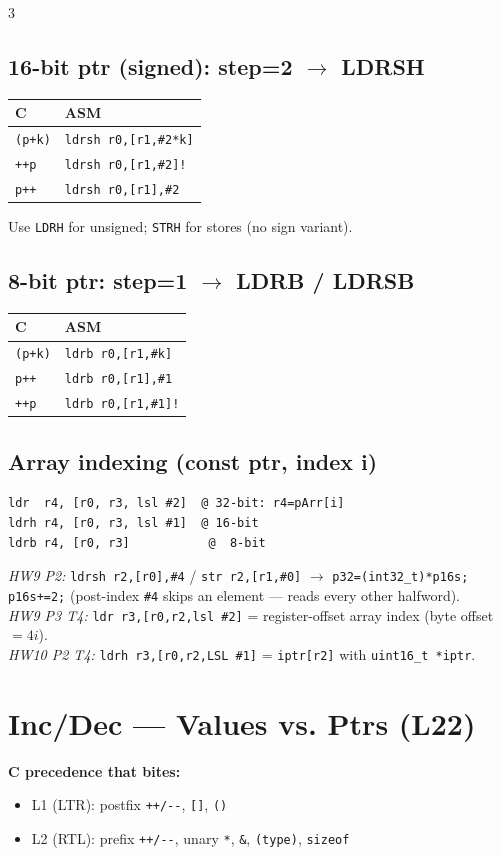 \documentclass[8pt,landscape]{extarticle}
\newcommand{\asm}[1]{\texttt{\scriptsize #1}}
\newcommand{\cee}[1]{\texttt{\scriptsize #1}}
\begin{document}
\begin{multicols*}{3}
\subsection{16-bit ptr (signed): step=2 $\to$ LDRSH}
\begin{tabular}{@{}ll@{}}
\toprule
C & ASM \\
\midrule
\cee{*(p+k)} & \asm{ldrsh r0,[r1,\#2*k]} \\
\cee{*++p}   & \asm{ldrsh r0,[r1,\#2]!}  \\
\cee{*p++}   & \asm{ldrsh r0,[r1],\#2}   \\
\bottomrule
\end{tabular}

Use \texttt{LDRH} for unsigned; \texttt{STRH} for stores (no sign variant).

\subsection{8-bit ptr: step=1 $\to$ LDRB / LDRSB}
\begin{tabular}{@{}ll@{}}
\toprule
C & ASM \\
\midrule
\cee{*(p+k)} & \asm{ldrb r0,[r1,\#k]}  \\
\cee{*p++}   & \asm{ldrb r0,[r1],\#1}  \\
\cee{*++p}   & \asm{ldrb r0,[r1,\#1]!} \\
\bottomrule
\end{tabular}

\subsection{Array indexing (const ptr, index i)}
\begin{lstlisting}
ldr  r4, [r0, r3, lsl #2]  @ 32-bit: r4=pArr[i]
ldrh r4, [r0, r3, lsl #1]  @ 16-bit
ldrb r4, [r0, r3]           @  8-bit
\end{lstlisting}

\textit{HW9 P2:} \asm{ldrsh r2,[r0],\#4} / \asm{str r2,[r1,\#0]} $\to$ \cee{*p32=(int32\_t)*p16s; p16s+=2;} (post-index \texttt{\#4} skips an element --- reads every other halfword).\\
\textit{HW9 P3 T4:} \asm{ldr r3,[r0,r2,lsl \#2]} = register-offset array index (byte offset $=4i$).\\
\textit{HW10 P2 T4:} \asm{ldrh r3,[r0,r2,LSL \#1]} = \cee{iptr[r2]} with \cee{uint16\_t *iptr}.

\section{Inc/Dec --- Values vs. Ptrs (L22)}
\textbf{C precedence that bites:}
\begin{itemize}
\item L1 (LTR): postfix \texttt{++/-{}-}, \texttt{[]}, \texttt{()}
\item L2 (RTL): prefix \texttt{++/-{}-}, unary \texttt{*}, \texttt{\&}, \texttt{(type)}, \texttt{sizeof}
\end{itemize}


\end{multicols*}
\end{document}
